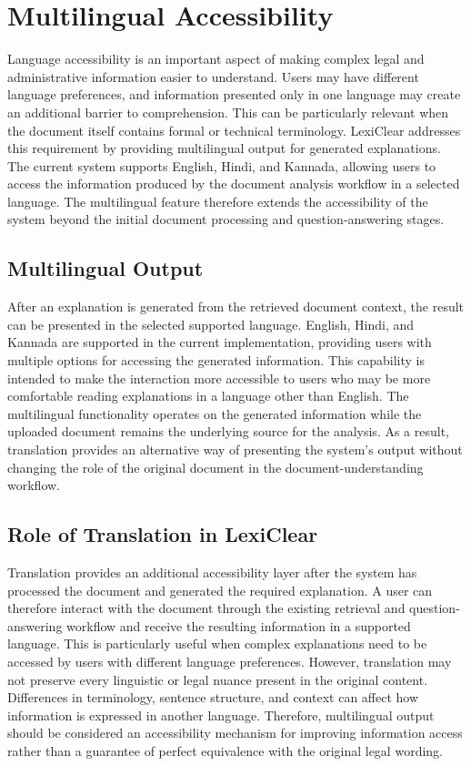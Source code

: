 \documentclass[12pt,a4paper,oneside]{report}
\begin{document}
\section{Multilingual Accessibility}

Language accessibility is an important aspect of making complex legal and
administrative information easier to understand. Users may have different
language preferences, and information presented only in one language may
create an additional barrier to comprehension. This can be particularly
relevant when the document itself contains formal or technical terminology.
LexiClear addresses this requirement by providing multilingual output for
generated explanations. The current system supports English, Hindi, and
Kannada, allowing users to access the information produced by the document
analysis workflow in a selected language. The multilingual feature therefore
extends the accessibility of the system beyond the initial document
processing and question-answering stages.

\subsection{Multilingual Output}

After an explanation is generated from the retrieved document context, the
result can be presented in the selected supported language. English,
Hindi, and Kannada are supported in the current implementation, providing
users with multiple options for accessing the generated information. This
capability is intended to make the interaction more accessible to users who
may be more comfortable reading explanations in a language other than
English. The multilingual functionality operates on the generated
information while the uploaded document remains the underlying source for
the analysis. As a result, translation provides an alternative way of
presenting the system's output without changing the role of the original
document in the document-understanding workflow.

\subsection{Role of Translation in LexiClear}

Translation provides an additional accessibility layer after the system has
processed the document and generated the required explanation. A user can
therefore interact with the document through the existing retrieval and
question-answering workflow and receive the resulting information in a
supported language. This is particularly useful when complex explanations
need to be accessed by users with different language preferences. However,
translation may not preserve every linguistic or legal nuance present in the
original content. Differences in terminology, sentence structure, and
context can affect how information is expressed in another language.
Therefore, multilingual output should be considered an accessibility
mechanism for improving information access rather than a guarantee of
perfect equivalence with the original legal wording.
\end{document}

